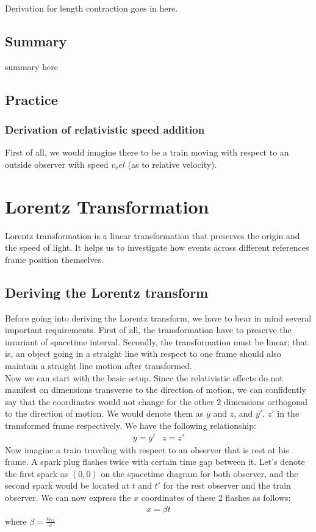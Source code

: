 \documentclass[11pt,letterpaper]{book}
\begin{document}
Derivation for length contraction goes in here.



\subsection{Summary}

summary here

\subsection{Practice}
\subsubsection{Derivation of relativistic speed addition}
First of all, we would imagine there to be a train moving with respect to an outside observer with speed $v_rel$ (as to relative velocity).

\section{Lorentz Transformation}
Lorentz transformation is a linear transformation that preserves the origin and the speed of light. It helps us to investigate how events across different references frame position themselves.
\subsection{Deriving the Lorentz transform}
Before going into deriving the Lorentz transform, we have to bear in mind several important requirements. First of all, the transformation have to preserve the invariant of spacetime interval. Secondly, the transformation must be linear; that is, an object going in a straight line with respect to one frame should also maintain a straight line motion after transformed. \\

Now we can start with the basic setup. Since the relativistic effects do not manifest on dimensions transverse to the direction of motion, we can confidently say that the coordinates would not change for the other 2 dimensions orthogonal to the direction of motion. We would denote them as $y$ and $z$, and $y'$, $z'$ in the transformed frame respectively. We have the following relationship:
\begin{align}
y=y' \;\;\; z=z'
\end{align}
Now imagine a train traveling with respect to an observer that is rest at his frame. A spark plug flashes twice with certain time gap between it. Let's denote the first spark as $(0,0)$ on the spacetime diagram for both observer, and the second spark would be located at $t$ and $t'$ for the rest observer and the train observer. We can now express the $x$ coordinates of these 2 flashes as follows:
\begin{align}
x=\beta t
\end{align}
where $\beta = \frac{v_{rel}}{c}$\\
\end{document}
